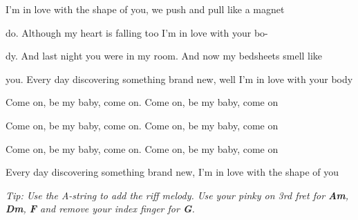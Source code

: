 \begin{song}
\bigskip

 I'm in love with the shape of you, we push and pull like a magnet \par
{}do. Although my heart is falling too I'm in love with your bo- \par
{}dy. And last night you were in my room. And now my bedsheets smell like \par
{}you. Every day discovering something brand new, well I'm in love with your body \par
{} Come on, be my baby, come on.  Come on, be my baby, come on \par
{} Come on, be my baby, come on.  Come on, be my baby, come on \par
{} Come on, be my baby, come on.  Come on, be my baby, come on \par
{} Every day discovering something brand new, I'm in love with the shape of you \par

\vfill

{
\it\smaller
Tip: Use the A-string to add the riff melody. Use your pinky on 3rd fret for
\textbf{Am}, \textbf{Dm}, \textbf{F} and remove your index finger for \textbf{G}.
}

\bigskip

\end{song}

